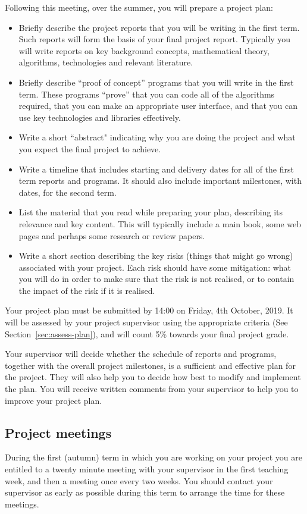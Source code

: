 \documentclass[11pt]{article}
\newcommand{\projectPlanSubmissionDate}{14:00 on Friday, 4th October, 2019}
\newcommand{\planweight}{5\% }
\begin{document}
Following this meeting, over the summer, you will prepare a project plan:
\begin{itemize}
\item
Briefly describe the project reports that you will be writing in the first term.  Such reports will form the basis of your final project report.  Typically you will write reports on  key background concepts, mathematical theory, algorithms, technologies and relevant literature.
\item
Briefly describe ``proof of concept'' programs that you will write in the first term.  These programs ``prove'' that you can code all of the algorithms required, that you can make an appropriate user interface, and that you can use key technologies and libraries effectively.
\item Write a short ``abstract" indicating why you are doing the project and what you expect the final project to achieve.
\item Write a timeline that includes starting and delivery dates for all of the first term reports and programs.  It should also include important milestones, with dates, for the second term.
\item List the material that you read while preparing your plan, describing its relevance and key content.  This will typically include a main book, some web pages and perhaps some research or review papers.
\item Write a short section describing the key risks (things that might go wrong) associated with your project.  Each risk should have some mitigation: what you will do in order to make sure that the risk is not realised, or to contain the impact of the risk if it is realised.
\end{itemize}

Your project plan must be submitted by \projectPlanSubmissionDate.  It will be assessed by your project supervisor using the appropriate criteria (See Section~\ref{sec:assess-plan}), and will count \planweight towards your final project grade.

Your supervisor will decide whether the schedule of reports and programs, together with the overall project milestones, is a sufficient and effective plan for the project.  They will also help you to decide how best to modify and implement the plan.  You will receive written comments from your supervisor to help you to improve your project plan.

\subsection{Project meetings}
During the first (autumn) term in which you are working on your project you are entitled to a twenty minute meeting with your supervisor in the first teaching week, and then a meeting once every two weeks.
You should contact your supervisor as early as possible during this term to arrange the time for these meetings.
\end{document}

